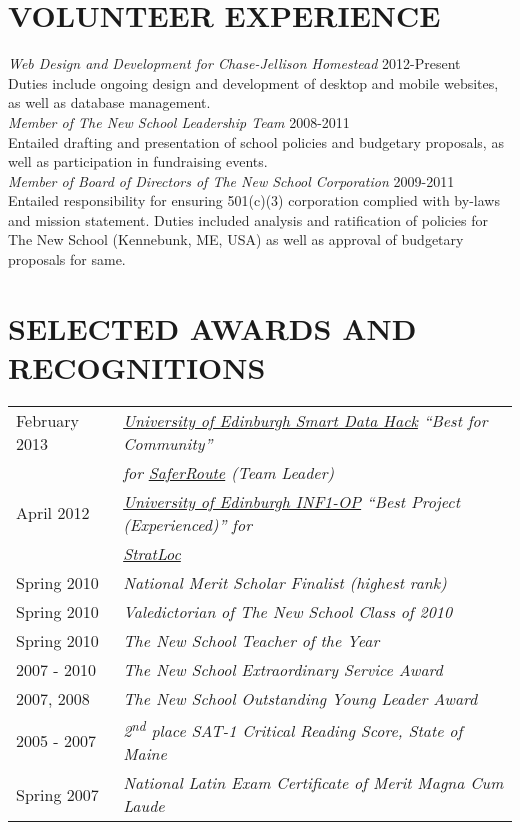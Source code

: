 \documentclass[line, margin]{res}
\newcommand{\ts}{\textsuperscript}
\begin{document}
\begin{resume}
\section{VOLUNTEER EXPERIENCE}
\textit{Web Design and Development for Chase-Jellison Homestead} \hfill 2012-Present \\Duties include ongoing design and development of desktop and mobile websites, as well as database management. \\[5pt]
\textit{Member of The New School Leadership Team} \hfill 2008-2011 \\
Entailed drafting and presentation of school policies and budgetary proposals, as well as participation in fundraising events. \\[5pt]
\textit{Member of Board of Directors of The New School Corporation} \hfill 2009-2011 \\
Entailed responsibility for ensuring 501(c)(3) corporation complied with by-laws and mission statement. Duties included analysis and ratification of policies for The New School (Kennebunk, ME, USA) as well as approval of budgetary proposals for same. 

\section{SELECTED AWARDS AND RECOGNITIONS}
\begin{tabular}{@{}l l}
February 2013 & \textit{\href{http://data.inf.ed.ac.uk/ilwhack/finalprojects.php}{University of Edinburgh Smart Data Hack} ``Best for Community''}\linebreak\\[1pt] 
&\textit{for \href{https://github.com/team-tusive/ilwhack}{SaferRoute} (Team Leader)} \linebreak \\[5pt]
April 2012 & \textit{\href{https://sites.google.com/site/2012oop/winners}{University of Edinburgh INF1-OP} ``Best Project (Experienced)'' for} \linebreak \\[1pt] 
 &\textit{\href{http://www.chasestevens.com/team2civ/}{StratLoc}} \linebreak \\[5pt]
Spring 2010 & \textit{National Merit Scholar Finalist (highest rank)} \\[5pt]
Spring 2010 & \textit{Valedictorian of The New School Class of 2010} \\[5pt]
Spring 2010 & \textit{The New School Teacher of the Year} \\[5pt]
2007 - 2010 & \textit{The New School Extraordinary Service Award} \\[5pt]
2007, 2008 & \textit{The New School Outstanding Young Leader Award} \\[5pt]
2005 - 2007 & \textit{2\ts{nd} place SAT-1 Critical Reading Score, State of Maine} \\[5pt]
Spring 2007 & \textit{National Latin Exam Certificate of Merit Magna Cum Laude}
\end{tabular}
\end{resume}
\end{document}
